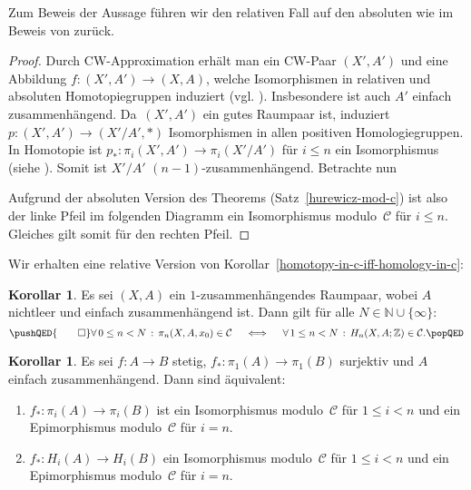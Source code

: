 \documentclass[11pt, a4paper, german]{article}
\theoremstyle{definition}
\newtheorem{kor}[lem]{Korollar}
\theoremstyle{remark}
\newcommand{\N}{\mathbb{N}} %
\newcommand{\Z}{\mathbb{Z}} %
\newcommand{\fa}[1]{\forall \, {#1} \,:\,}
\newcommand{\SC}{\mathcal{C}} %
\begin{document}
Zum Beweis der Aussage führen wir den relativen Fall auf den absoluten wie im Beweis von \cite[Thm 4.32]{hatcher:at} zurück.

\begin{proof}
  Durch CW-Approximation erhält man ein CW-Paar $(X', A')$ und eine Abbildung $f : (X', A') \to (X, A)$, welche Isomorphismen in relativen und absoluten Homotopiegruppen induziert (vgl. \cite[\mbox{} Ex 4.14]{hatcher:at}).
  Insbesondere ist auch $A'$ einfach zusammenhängend.
  Da~$(X', A')$ ein gutes Raumpaar ist, induziert $p : (X', A') \to (X'/A', *)$ Isomorphismen in allen positiven Homologiegruppen.
  In Homotopie ist $p_* : \pi_i(X', A') \to \pi_i(X'/A')$ für $i \leq n$ ein Isomorphismus (siehe \cite[\mbox{} Prop 4.28]{hatcher:at}).
  Somit ist $X'/A'$ $(n {-} 1)$-zusammenhängend.
  Betrachte nun
  \begin{center}
  \end{center}
  Aufgrund der absoluten Version des Theorems (Satz~\ref{hurewicz-mod-c}) ist also der linke Pfeil im folgenden Diagramm ein Isomorphismus modulo~$\SC$ für $i \leq n$.
  Gleiches gilt somit für den rechten Pfeil.
\end{proof}

Wir erhalten eine relative Version von Korollar~\ref{homotopy-in-c-iff-homology-in-c}:

\begin{kor}\label{homotopy-in-c-iff-homology-in-c-relative}
  Es sei $(X, A)$ ein $1$-zusammenhängendes Raumpaar, wobei $A$ nichtleer und einfach zusammenhängend ist.
  Dann gilt für alle $N \in \N \cup \{ \infty \}$:
  \[
    \pushQED{\qed} 
    \fa{0 \leq n < N} \pi_n(X, A, x_0) \in \SC
    \quad \iff \quad
    \fa{1 \leq n < N} H_n(X, A; \Z) \in \SC.
    \qedhere
    \popQED
  \]
\end{kor}

\begin{kor}\label{homotopy-homology-equivalence-mod-c}
  Es sei $f : A \to B$ stetig, $f_* : \pi_1(A) \to \pi_1(B)$ surjektiv und $A$ einfach zusammenhängend.
  Dann sind äquivalent:
  \begin{enumerate}[label=(\alph*)]
    \item $f_* : \pi_i(A) \to \pi_i(B)$ ist ein Isomorphismus modulo~$\SC$ für $1 \leq i < n$ und ein Epimorphismus modulo~$\SC$ für $i = n$.
    \item $f_* : H_i(A) \to H_i(B)$ ein Isomorphismus modulo~$\SC$ für $1 \leq i < n$ und ein Epimorphismus modulo~$\SC$ für $i = n$.
  \end{enumerate}
\end{kor}
\end{document}
